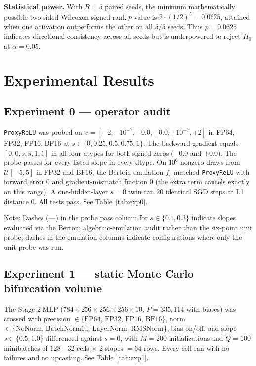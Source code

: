 \documentclass[11pt]{article}
\begin{document}
\textbf{Statistical power.} With $R=5$ paired seeds, the minimum mathematically possible two-sided Wilcoxon signed-rank $p$-value is $2\cdot(1/2)^5=0.0625$, attained when one activation outperforms the other on all $5/5$ seeds. Thus $p=0.0625$ indicates directional consistency across all seeds but is underpowered to reject $H_0$ at $\alpha=0.05$.

\section{Experimental Results}\label{sec:results}

\subsection{Experiment 0 --- operator audit}\label{sec:exp0}
\texttt{ProxyReLU} was probed on $x=[-2,-10^{-7},-0.0,+0.0,+10^{-7},+2]$ in FP64, FP32, FP16, BF16 at $s\in\{0,0.25,0.5,0.75,1\}$. The backward gradient equals $[0,0,s,s,1,1]$ in all four dtypes for both signed zeros ($\mathtt{-0.0}$ and $\mathtt{+0.0}$). The probe passes for every listed slope in every dtype. On $10^6$ nonzero draws from $\mathcal{U}[-5,5]$ in FP32 and BF16, the Bertoin emulation $f_s$ matched \texttt{ProxyReLU} with forward error $0$ and gradient-mismatch fraction $0$ (the extra term cancels exactly on this range). A one-hidden-layer $s=0$ twin ran $20$ identical SGD steps at L1 distance $0$. All tests pass. See Table~\ref{tab:exp0}.

\begin{table}[htbp]
\centering
\small

\par\vspace{4pt}
\begin{minipage}{\linewidth}
\footnotesize
\noindent Note: Dashes (---) in the probe pass column for $s\in\{0.1,0.3\}$ indicate slopes evaluated via the Bertoin algebraic-emulation audit rather than the six-point unit probe; dashes in the emulation columns indicate configurations where only the unit probe was run.
\end{minipage}
\caption{Experiment 0 operator audit: probe pass, forward error, and emulation mismatch for \texttt{ProxyReLU} across dtypes and slopes.}
\label{tab:exp0}
\end{table}

\subsection{Experiment 1 --- static Monte Carlo bifurcation volume}\label{sec:exp1}
The Stage-2 MLP ($784\times256\times256\times256\times10$, $P=335{,}114$ with biases) was crossed with precision $\in\{\text{FP64, FP32, FP16, BF16}\}$, norm $\in\{\text{NoNorm, BatchNorm1d, LayerNorm, RMSNorm}\}$, bias on/off, and slope $s\in\{0.5,1.0\}$ differenced against $s=0$, with $M=200$ initializations and $Q=100$ minibatches of $128$---32 cells $\times$ 2 slopes $=64$ rows. Every cell ran with no failures and no upcasting. See Table~\ref{tab:exp1}.
\end{document}
